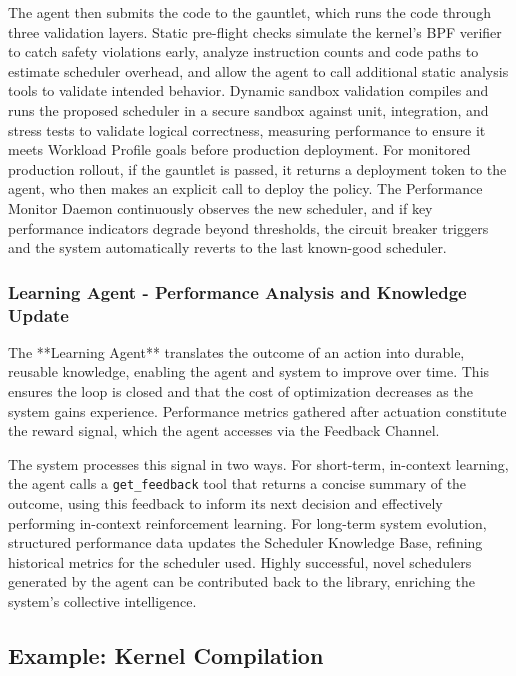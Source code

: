 The agent then submits the code to the gauntlet, which runs the code through three validation layers. Static pre-flight checks simulate the kernel's BPF verifier to catch safety violations early, analyze instruction counts and code paths to estimate scheduler overhead, and allow the agent to call additional static analysis tools to validate intended behavior. Dynamic sandbox validation compiles and runs the proposed scheduler in a secure sandbox against unit, integration, and stress tests to validate logical correctness, measuring performance to ensure it meets Workload Profile goals before production deployment. For monitored production rollout, if the gauntlet is passed, it returns a deployment token to the agent, who then makes an explicit call to deploy the policy. The Performance Monitor Daemon continuously observes the new scheduler, and if key performance indicators degrade beyond thresholds, the circuit breaker triggers and the system automatically reverts to the last known-good scheduler.

\subsubsection{Learning Agent - Performance Analysis and Knowledge Update}

The **Learning Agent** translates the outcome of an action into durable, reusable knowledge, enabling the agent and system to improve over time. This ensures the loop is closed and that the cost of optimization decreases as the system gains experience. Performance metrics gathered after actuation constitute the reward signal, which the agent accesses via the Feedback Channel.

The system processes this signal in two ways. For short-term, in-context learning, the agent calls a \texttt{get\_feedback} tool that returns a concise summary of the outcome, using this feedback to inform its next decision and effectively performing in-context reinforcement learning. For long-term system evolution, structured performance data updates the Scheduler Knowledge Base, refining historical metrics for the scheduler used. Highly successful, novel schedulers generated by the agent can be contributed back to the library, enriching the system's collective intelligence.


\subsection{Example: Kernel Compilation}

